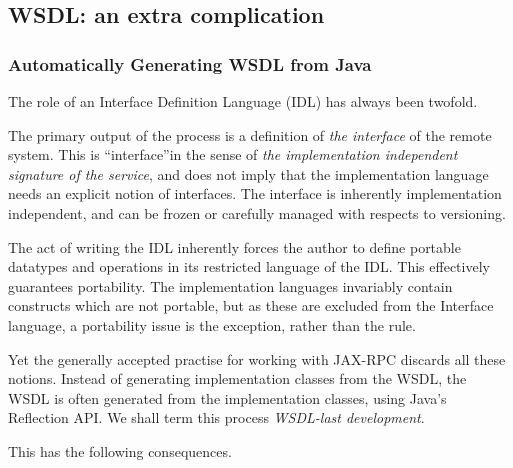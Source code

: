\subsection{WSDL: an extra complication}
\subsubsection{Automatically Generating WSDL from Java}
\label{objections:o-x:wsdl-gen}

The role of an Interface Definition Language (IDL) has always been
twofold. 

The primary output of the process is a definition of \emph{the
interface} of the remote system. This is ``interface''in the sense of
\emph{the implementation independent signature of the service}, and does
not imply that the implementation language needs an explicit notion of
interfaces. The interface is inherently implementation independent, and
can be frozen or carefully managed with respects to versioning.

The act of writing the IDL inherently forces the author to define 
portable datatypes and operations in its restricted language of the IDL.
This effectively guarantees portability. The implementation languages
invariably contain constructs which are not portable, but as these are
excluded from the Interface language, a portability issue is the
exception, rather than the rule.

Yet the generally accepted practise for working with JAX-RPC discards
all these notions. Instead of generating implementation classes from the
WSDL, the WSDL is often generated from the implementation classes, using
Java's Reflection API. We shall term this process \emph{WSDL-last development}.

This has the following consequences. 


